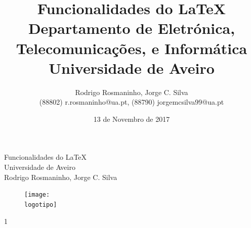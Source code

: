 \documentclass{report}
\begin{document}
%
\def\titulo{Funcionalidades do \LaTeX}
\def\data{13 de Novembro de 2017}
\def\autores{Rodrigo Rosmaninho, Jorge C. Silva}
\def\autorescontactos{(88802) r.rosmaninho@ua.pt, (88790) jorgemcsilva99@ua.pt}
\def\versao{1}
\def\departamento{Departamento de Eletrónica, Telecomunicações, e Informática}
\def\empresa{Universidade de Aveiro}
\def\logotipo{ua.pdf}
%
%
\begin{titlepage}

\begin{center}
%
\vspace*{50mm}
%
{\Huge \titulo}\\ 
%
\vspace{10mm}
%
{\Large \empresa}\\
%
\vspace{10mm}
%
{\LARGE \autores}\\ 
%
\vspace{30mm}
%
\begin{figure}[h]
\center
\texttt{[image: \\logotipo]}
\end{figure}
%
\vspace{30mm}
\end{center}
%
\begin{flushright}
\versao
\end{flushright}
\end{titlepage}

\title{%
{\Huge\textbf{\titulo}}\\
{\Large \departamento\\ \empresa}
}
%
\author{%
    \autores \\
    \autorescontactos
}
%
\date{\data}
%
\maketitle

\end{document}
